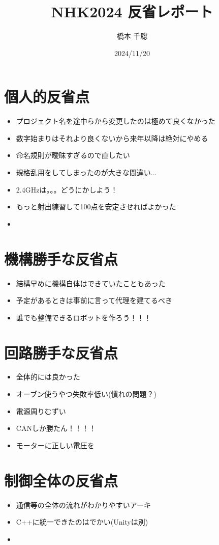 \documentclass[a4paper,11pt]{jsarticle}
\title{NHK2024 反省レポート}
\date{2024/11/20}
\author{橋本 千聡}
\begin{document}
\maketitle
\section*{個人的反省点}
\begin{itemize}
  \item プロジェクト名を途中らから変更したのは極めて良くなかった
  \item 数字始まりはそれより良くないから来年以降は絶対にやめる
  \item 命名規則が曖昧すぎるので直したい
  \item 規格乱用をしてしまったのが大きな間違い...
  \item 2.4GHzは。。。どうにかしよう！
  \item もっと射出練習して100点を安定させればよかった
  \item 
\end{itemize}

\section*{機構勝手な反省点}
\begin{itemize}
  \item 結構早めに機構自体はできていたこともあった
  \item 予定があるときは事前に言って代理を建てるべき
  \item 誰でも整備できるロボットを作ろう！！！
\end{itemize}

\section*{回路勝手な反省点}
\begin{itemize}
  \item 全体的には良かった
  \item オーブン使うやつ失敗率低い(慣れの問題？)
  \item 電源周りむずい
  \item CANしか勝たん！！！！
  \item モーターに正しい電圧を
\end{itemize}

\section*{制御全体の反省点}
\begin{itemize}
  \item 通信等の全体の流れがわかりやすいアーキ
  \item C++に統一できたのはでかい(Unityは別)
  \item 
\end{itemize}
\end{document}
